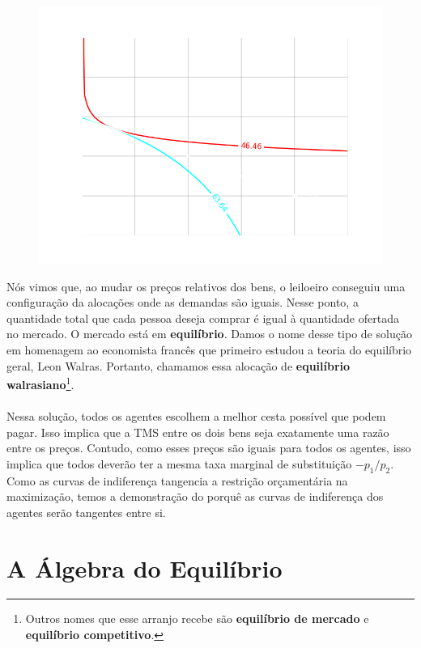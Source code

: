 \documentclass[a4paper,11pt,oneside]{book}
\theoremstyle{definition}
\theoremstyle{break}
\begin{document}
\begin{figure}[H]
\centering
\includegraphics[scale=0.45]{cap32_4-caixa_edgeworth_6.png}
\end{figure}

\newpage

Nós vimos que, ao mudar os preços relativos dos bens, o leiloeiro conseguiu uma configuração da alocações onde as demandas são iguais. Nesse ponto, a quantidade total que cada pessoa deseja comprar é igual à quantidade ofertada no mercado. O mercado está em \textbf{equilíbrio}. Damos o nome desse tipo de solução em homenagem ao economista francês que primeiro estudou a teoria do equilíbrio geral, Leon Walras. Portanto, chamamos essa alocação de \textbf{equilíbrio walrasiano}\footnote{Outros nomes que esse arranjo recebe são \textbf{equilíbrio de mercado} e \textbf{equilíbrio competitivo}.}.
\\~\\
Nessa solução, todos os agentes escolhem a melhor cesta possível que podem pagar. Isso implica que a TMS entre os dois bens seja exatamente uma razão entre os preços. Contudo, como esses preços são iguais para todos os agentes, isso implica que todos deverão ter a mesma taxa marginal de substituição $-p_1/p_2$. Como as curvas de indiferença tangencia a restrição orçamentária na maximização, temos a demonstração do porquê as curvas de indiferença dos agentes serão tangentes entre si. 

\section{A Álgebra do Equilíbrio}
\end{document}
